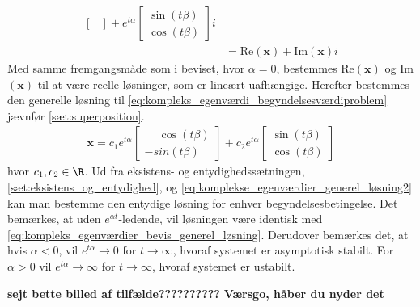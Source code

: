 \begin{bev}
\begin{itemize}
\begin{align*}
\begin{bmatrix}
       \end{bmatrix}
       + e^{t\alpha} 
       \begin{bmatrix}
           \sin(t\beta) \\ \cos(t\beta)
       \end{bmatrix}i \\
       &= \text{Re}(\textbf{x}) + \text{Im}(\textbf{x})i
   \end{align*}
   Med samme fremgangsmåde som i beviset, hvor $\alpha = 0$, bestemmes Re$(\textbf{x})$ og Im$(\textbf{x})$ til at være reelle løsninger, som er lineært uafhængige. Herefter bestemmes den generelle løsning til \eqref{eq:kompleks_egenværdi_begyndelsesværdiproblem} jævnfør \autoref{sæt:superposition}.
   \begin{align} \label{eq:komplekse_egenværdier_generel_løsning2}
       \textbf{x} = c_1e^{t\alpha}
       \begin{bmatrix}
           \phantom{-}\cos(t\beta) \\ -sin(t\beta)
       \end{bmatrix}
       + c_2e^{t\alpha} 
       \begin{bmatrix}
           \sin(t\beta) \\ \cos(t\beta)
       \end{bmatrix} 
   \end{align}
   hvor $c_1,c_2 \in \R$. Ud fra eksistens- og entydighedssætningen, \autoref{sæt:eksistens_og_entydighed}, og \eqref{eq:komplekse_egenværdier_generel_løsning2} kan man bestemme den entydige løsning for enhver begyndelsesbetingelse. Det bemærkes, at uden $e^{\alpha t}$-ledende, vil løsningen være identisk med \eqref{eq:kompleks_egenværdier_bevis_generel_løsning}. Derudover bemærkes det, at hvis $\alpha<0$, vil $e^{t\alpha} \to 0$ for $t \to \infty$, hvoraf systemet er asymptotisk stabilt. For $\alpha>0$ vil $e^{t\alpha} \to \infty$ for $t \to \infty$, hvoraf systemet er ustabilt.
   
   \textbf{sejt bette billed af tilfælde??????????}
   \textbf{Værsgo, håber du nyder det}
   

\end{itemize}
\end{bev}
